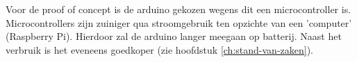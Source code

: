 \chapter{}
\label{ch:corpus}

\section{}
\label{ch:proof-of-concept}

Voor de proof of concept is de arduino gekozen wegens dit een microcontroller is. Microcontrollers zijn zuiniger qua stroomgebruik ten opzichte van een 'computer' (Raspberry Pi). Hierdoor zal de arduino langer meegaan op batterij. Naast het verbruik is het eveneens goedkoper (zie hoofdstuk \ref{ch:stand-van-zaken}).

